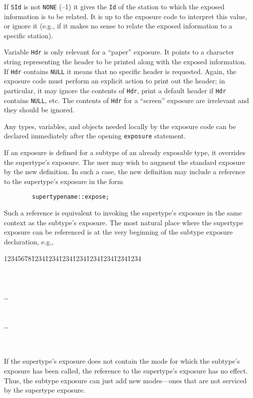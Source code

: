 If {\tt SId} is not {\tt NONE} (--1) it gives the {\tt Id} of the station
to which the exposed information is to be related.
It is up to the exposure code to interpret this value, or
ignore it (e.g., if it makes no sense to relate the exposed information to a
specific station).

Variable {\tt Hdr} is only relevant
for a ``paper'' exposure.
It points to a character string
representing the header to be printed along with the exposed information.
If {\tt Hdr} contains {\tt NULL} it means that no specific header is
requested.
Again, the exposure code must perform an explicit action to print out the
header; in particular, it may ignore the contents of {\tt Hdr}, print a
default header if {\tt Hdr} contains {\tt NULL}, etc.
The contents of {\tt Hdr} for a ``screen'' exposure are irrelevant and they
should be ignored.

Any types, variables, and objects needed locally by the exposure code
can be declared immediately after the opening {\tt exposure} statement.

If an exposure is defined for a subtype of an already exposable type, it
overrides the supertype's exposure.
The user may wish to augment the standard exposure by the new definition.
In such a case, the new definition may include a reference to the
supertype's exposure in the form
\begin{verbatim}
        supertypename::expose;
\end{verbatim}
Such a reference is equivalent to invoking the supertype's exposure in the
same context as the subtype's exposure.
The most natural place where the supertype exposure can be referenced is
at the very beginning of the subtype exposure declaration, e.g.,
{\tt\begin{tabbing}
12345678\=1234\=1234\=1234\=1234\=1234\=1234\=1234\=1234\kill
{} \\
\>  \\
\>  \\
\>  \\
\> \> \>\ldots \\
\> \>{\tt \};} \\
\>  \\
\> \> \>\ldots \\
\> \>{\tt \};} \\
\>{\tt \};} \\
\end{tabbing}}
If the supertype's exposure does not contain the mode for which the
subtype's exposure has been called, the reference to the supertype's exposure
has no effect.
Thus, the subtype exposure can just add new modes---ones that are not serviced
by the supertype exposure.

